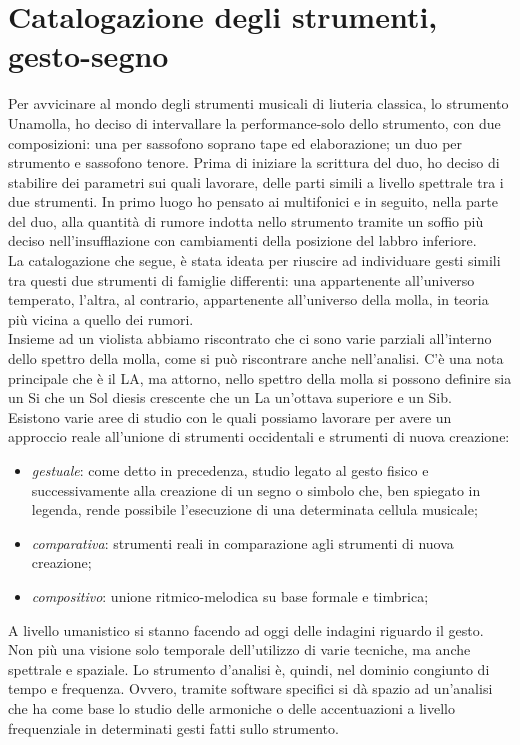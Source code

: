 
\section{Catalogazione degli strumenti, gesto-segno}

Per avvicinare al mondo degli strumenti musicali di liuteria classica, lo strumento Unamolla, ho deciso di intervallare la performance-solo dello strumento, con due composizioni: una per sassofono soprano tape ed elaborazione; un duo per strumento e sassofono tenore. Prima di iniziare la scrittura del duo, ho deciso di stabilire dei parametri sui quali lavorare, delle parti simili a livello spettrale tra i due strumenti. In primo luogo ho pensato ai multifonici e in seguito, nella parte del duo, alla quantità di rumore indotta nello strumento tramite un soffio più deciso nell'insufflazione  con cambiamenti della posizione del labbro inferiore. \\
La catalogazione che segue, è stata ideata per riuscire ad individuare gesti simili tra questi due strumenti di famiglie differenti: una appartenente all’universo temperato, l’altra, al contrario, appartenente all’universo della molla, in teoria più vicina a quello dei rumori. \\
Insieme ad un violista abbiamo riscontrato che ci sono varie parziali all’interno dello spettro della molla, come si può riscontrare anche nell’analisi. C’è una nota principale che è il LA, ma attorno, nello spettro della molla si possono definire sia un Si che un Sol diesis crescente che un La un’ottava superiore e un Sib. \\
Esistono varie aree di studio con le quali possiamo lavorare per avere un approccio reale all’unione di strumenti occidentali e strumenti di nuova creazione: \\
\begin{itemize}
\item{\textit{gestuale}: come detto in precedenza, studio legato al gesto fisico e successivamente alla creazione di un segno o simbolo che, ben spiegato in legenda, rende possibile l’esecuzione di una determinata cellula musicale;}
\item{\textit{comparativa}: strumenti reali in comparazione agli strumenti di nuova creazione;}
\item{\textit{compositivo}: unione ritmico-melodica su base formale e timbrica;}
\end{itemize}
A livello umanistico si stanno facendo ad oggi delle indagini riguardo il gesto. Non più una visione solo temporale dell’utilizzo di varie tecniche, ma anche spettrale e spaziale. Lo strumento d’analisi è, quindi, nel dominio congiunto di tempo e frequenza. Ovvero, tramite software specifici si dà spazio ad un’analisi che ha come base lo studio delle armoniche o delle accentuazioni a livello frequenziale in determinati gesti fatti sullo strumento. \\


